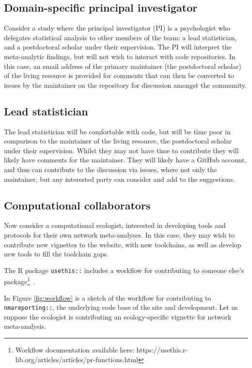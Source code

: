 \documentclass[12pt]{article}\usepackage[]{graphicx}\usepackage[]{color}
\newcommand{\package}[1]{\texttt{{#1::}}}
\begin{document}
\subsection{Domain-specific principal investigator}

Consider a study where the principal investigator (PI) is a psychologist who delegates statistical analysis to other members of the team: a lead statistician, and a postdoctoral scholar under their supervision. The PI will interpret the meta-analytic findings, but will not wish to interact with code repositories. In this case, an email address of the primary maintainer (the postdoctoral scholar) of the living resource is provided for comments that can then be converted to issues by the maintainer on the repository for discussion amongst the community.

\subsection{Lead statistician}

The lead statistician will be comfortable with code, but will be time poor in comparison to the maintainer of the living resource, the postdoctoral scholar under their supervision. Whilst they may not have time to contribute they will likely have comments for the maintainer. They will likely have a GitHub account, and thus can contribute to the discussion via issues, where not only the maintainer, but any interested party can consider and add to the suggestions.

\subsection{Computational collaborators}

Now consider a computational ecologist, interested in developing tools and protocols for their own network meta-analyses. In this case, they may wish to contribute new vignettes to the website, with new toolchains, as well as develop new tools to fill the toolchain gaps.

The R package \package{usethis} includes a workflow for contributing to someone else's package\footnote{Workflow documentation available here: https://usethis.r-lib.org/articles/articles/pr-functions.html}~\cite{wickham_usethis:_2019}.

In Figure \ref{fig:workflow} is a sketch of the workflow for contributing to \package{nmareporting}, the underlying code base of the site and development. Let us suppose the ecologist is contributing an ecology-specific vignette for network meta-analysis.
\end{document}
